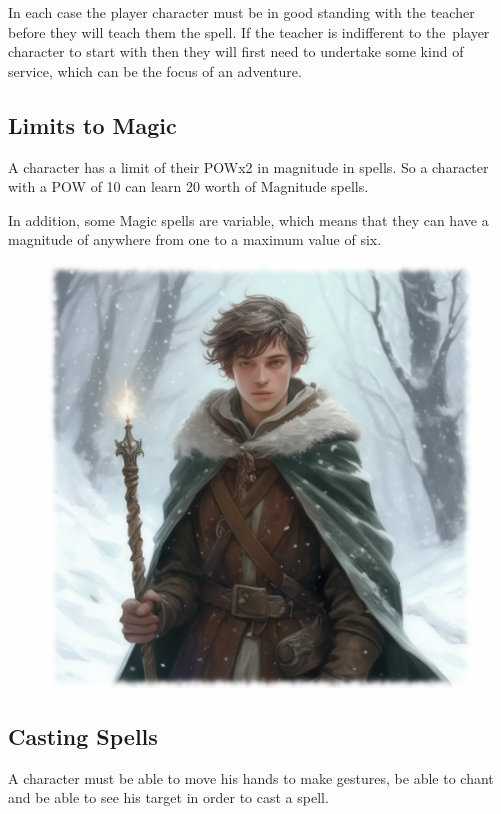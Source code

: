 In each case the player character must be in good standing with the teacher before they will teach them the spell. If the teacher is indifferent to the player character to start with then they will first need to undertake some kind of service, which can be the focus of an adventure.

\subsection{Limits to Magic}
A character has a limit of their POWx2 in magnitude in spells. So a character with a POW of 10 can learn 20 worth of Magnitude spells.

In addition, some Magic spells are variable, which means that they can have a magnitude of anywhere from one to a maximum value of six.

\begin{figure}[h]
\begin{center}
\includegraphics[scale=0.23]{img/ai-images/young-wizard-in-snow.png}
\end{center}
\end{figure}

\subsection{Casting Spells}
A character must be able to move his hands to make gestures, be able to chant and be able to see his target in order to cast a spell.

